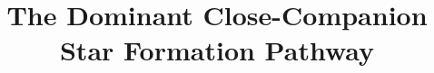 \documentclass[linenumbers,twocolumn, twocolappendix]{aastex631}
\begin{document}
\title{The Dominant Close-Companion Star Formation Pathway}


\end{document}

